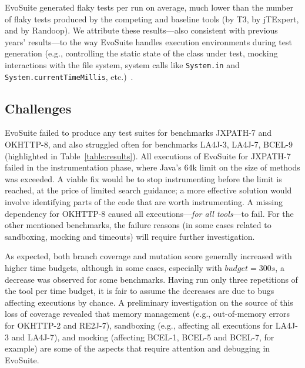 \documentclass[10pt,conference]{IEEEtran}
\newcommand{\EVOSUITE}{{\sc EvoSuite}\xspace}
\newcommand{\JTEXPERT}{{\sc jTExpert}\xspace}
\newcommand{\RANDOOP}{{\sc Randoop}\xspace}
\newcommand{\TT}{{\sc T3}\xspace}
\begin{document}

\EVOSUITE generated \FlakyEvosuite flaky tests per run on average,
much lower than the number of flaky tests produced by the competing
and baseline tools (\FlakyTthree by \TT, \FlakyJtexpert by \JTEXPERT,
and \FlakyRandoop by \RANDOOP). We attribute these results---also
consistent with previous years' results---to the way \EVOSUITE handles
execution environments during test generation (e.g., controlling the
static state of the class under test, mocking interactions with the
file system, system calls like \texttt{System.in} and
\texttt{System.currentTimeMillis}, etc.)~\cite{arcuri2014automated}.


\subsection{Challenges}

\EVOSUITE failed to produce any test suites for benchmarks JXPATH-7 and
OKHTTP-8, and also struggled often for benchmarks LA4J-3, LA4J-7,
BCEL-9 (highlighted in Table~\ref{table:results}). All executions of
\EVOSUITE for JXPATH-7 failed in the instrumentation phase, where
Java's 64k limit on the size of methods was exceeded. A viable fix
would be to stop instrumenting before the limit is reached, at the
price of limited search guidance; a more effective solution would
involve identifying parts of the code that are worth instrumenting. A
missing dependency for OKHTTP-8 caused all executions---\emph{for all
  tools}---to fail. For the other mentioned benchmarks, the failure
reasons (in some cases related to sandboxing, mocking and timeouts)
will require further investigation.

As expected, both branch coverage and mutation score generally
increased with higher time budgets, although in some cases, especially
with $budget=300s$, a decrease was observed for some
benchmarks. Having run only three repetitions of the tool per time
budget, it is fair to assume the decreases are due to bugs affecting
executions by chance. A preliminary investigation on the source of
this loss of coverage revealed that memory management (e.g.,
out-of-memory errors for OKHTTP-2 and RE2J-7), sandboxing (e.g.,
affecting all executions for LA4J-3 and LA4J-7), and mocking
(affecting BCEL-1, BCEL-5 and BCEL-7, for example) are some of the
aspects that require attention and debugging in \EVOSUITE.
\end{document}
